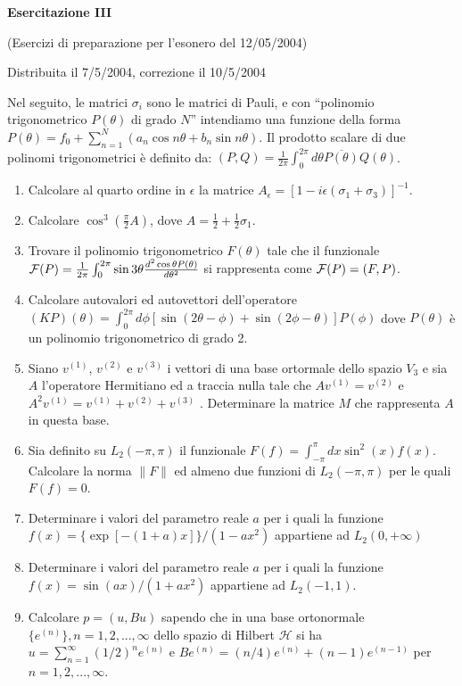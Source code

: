 \documentclass[a4paper,10pt]{article}
\begin{document}
\centerline{\LARGE \bf Esercitazione III}
\centerline{(Esercizi di preparazione per l'esonero del 12/05/2004)}
\centerline{Distribuita il 7/5/2004, correzione il 10/5/2004}
\vskip10pt
Nel seguito, le matrici $\sigma_i$ sono le matrici di Pauli, e con
``polinomio trigonometrico $P(\theta)$ di grado $N$'' intendiamo una funzione della forma
$P(\theta)=f_0 + \sum_{n=1}^N (a_n \cos n \theta + b_n \sin n \theta)$.
Il prodotto scalare di due polinomi trigonometrici \`e definito da: 
$(P,Q)= \frac{1}{2\pi} \int_0^{2\pi} d\theta \overline{P(\theta)} Q(\theta)$.

\begin{enumerate}
\item Calcolare al quarto ordine in $\epsilon$ la matrice 
$A_\epsilon=[1-i \epsilon (\sigma_1 + \sigma_3)]^{-1}$.
\item Calcolare 
$\cos^3 (\frac{\pi}{2} A)$, dove $A= \frac{1}{2} + \frac{1}{2} \sigma_1$.
\item Trovare il polinomio trigonometrico $F(\theta)$ tale che il funzionale
${\cal F}(P)=\frac{1}{2\pi} \int_0^{2\pi} \sin 3\theta 
\frac{d^2 \cos \theta P(\theta)}{d\theta^2}$ si rappresenta come ${\cal F}(P)=(F,P)$.
\item Calcolare autovalori ed autovettori dell'operatore 
$(KP)(\theta) = \int_0^{2\pi} d \phi [\sin(2 \theta - \phi) + \sin(2 \phi -\theta)]
P(\phi)$
dove $P(\theta)$ \`e un polinomio trigonometrico di grado 2.
\item Siano $v^{(1)}$, $v^{(2)}$ e $v^{(3)}$ i vettori di una base ortormale dello spazio $V_3$
e sia $A$ l'operatore Hermitiano ed a traccia nulla tale che $A v^{(1)}= v^{(2)}$ e $A^2 v^{(1)}= v^{(1)}+ v^{(2)}+ v^{(3)}$ . Determinare la matrice $M$ che rappresenta $A$ in questa base.
\item Sia definito su $L_2(-\pi,\pi)$ il funzionale $F(f)=\int_{-\pi}^\pi dx\sin ^2(x) f(x)$. Calcolare la norma $ \| F\|$ ed almeno due funzioni di $L_2(-\pi,\pi)$ per le quali $ F(f)=0$. 
\item Determinare i valori del parametro reale $a$ per i quali la funzione $f(x)=\{\exp[-(1+a)x]\}/(1-ax^2)$ appartiene ad $L_2(0,+\infty)$
\item Determinare i valori del parametro reale $a$ per i quali la funzione $f(x)=\sin(ax)/(1+ax^2)$ appartiene ad $L_2(-1,1)$.
\item Calcolare $p=(u,Bu)$ sapendo che in una base ortonormale $\{e^{(n)}\}, n=1,2,...,\infty$ dello spazio di Hilbert $\mathcal{H}$ si ha $u=\sum_{n=1}^{\infty} (1/2)^n e^{(n)}$ e $B e^{(n)}=(n/4) e^{(n)}+(n-1) e^{(n-1)}$ per $ n=1,2,...,\infty $.
\end{enumerate}
\end{document}
